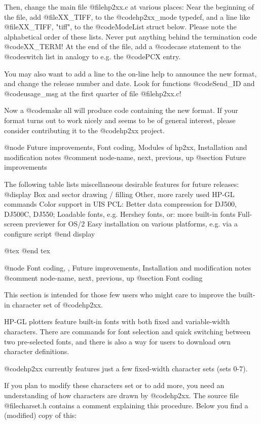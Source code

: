 Then, change the main file @file{hp2xx.c} at various places: Near the
beginning of the file, add @file{XX_TIFF, } to the @code{hp2xx_mode} typedef,
and a line like @file{XX_TIFF,   "tiff", } to the @code{ModeList} struct below.
Please note the alphabetical order of these lists. Never put anything behind
the termination code @code{XX_TERM}! At the end of the file,
add a @code{case} statement to the @code{switch} list in analogy to e.g.
the @code{PCX} entry.

You may also want to add a line to the on-line help to
announce the new format, and change the release number and date.
Look for functions @code{Send_ID} and @code{usage_msg} at the first quarter
of file @file{hp2xx.c}!

Now a @code{make all} will produce code containing the new format.
If your format turns out to work nicely and seems to be of general interest,
please consider contributing it to the @code{hp2xx} project.



@node Future improvements, Font coding, Modules of hp2xx, Installation and modification notes
@comment  node-name,  next,  previous,  up
@section Future improvements

The following table lists miscellaneous desirable features for future
releases:
@display
  Box and sector drawing / filling
  Other, more rarely used HP-GL commands
  Color support in UIS 
  PCL: Better data compression for DJ500, DJ500C, DJ550;
  Loadable fonts, e.g. Hershey fonts, or: more built-in fonts
  Full-screen previewer for OS/2
  Easy installation on various platforms, e.g. via a configure script
@end display

@tex
\page
@end tex

@node Font coding, , Future improvements, Installation and modification notes
@comment  node-name,  next,  previous,  up
@section Font coding

This section is intended for those few users who might care to
improve the built-in character set of @code{hp2xx}.

HP-GL plotters feature built-in fonts with both fixed and
variable-width characters. There are commands for font selection
and quick switching between two pre-selected fonts, and there
is also a way for users to download own character definitions.

@code{hp2xx} currently features just a few fixed-width  character sets 
(sets 0-7).

If you plan to modify these characters set or to add more,
you need an understanding of how characters are drawn by
@code{hp2xx}. The source file @file{charset.h} contains a comment
explaining this procedure. Below you find a (modified) copy of
this:

